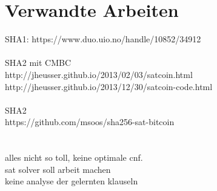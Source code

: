 \section{Verwandte Arbeiten}

SHA1: https://www.duo.uio.no/handle/10852/34912\\
~\\
SHA2 mit CMBC\\
http://jheusser.github.io/2013/02/03/satcoin.html\\
http://jheusser.github.io/2013/12/30/satcoin-code.html\\
~\\
SHA2\\
https://github.com/msoos/sha256-sat-bitcoin\\
~\\
~\\
alles nicht so toll, keine optimale cnf.\\
sat solver soll arbeit machen\\
keine analyse der gelernten klauseln

